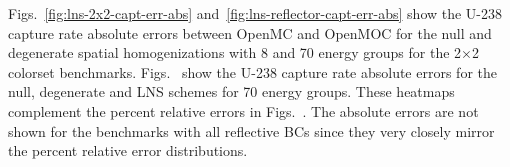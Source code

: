 \begin{appendices}
Figs.~\ref{fig:lns-2x2-capt-err-abs} and~\ref{fig:lns-reflector-capt-err-abs} show the U-238 capture rate absolute errors between OpenMC and OpenMOC for the null and degenerate spatial homogenizations with 8 and 70 energy groups for the 2$\times$2 colorset benchmarks. Figs.~ show the U-238 capture rate absolute errors for the null, degenerate and \ac{LNS} schemes for 70 energy groups. These heatmaps complement the percent relative errors in Figs.~. The absolute errors are not shown for the benchmarks with all reflective \acp{BC} since they very closely mirror the percent relative error distributions.






\end{appendices}
